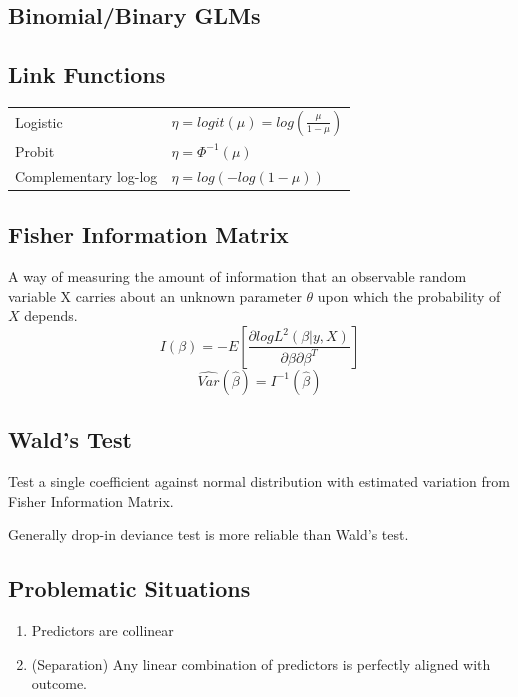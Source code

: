 \documentclass[10pt,landscape, fleqn]{article}
\begin{document}
\begin{multicols}{3}
		\section{Binomial/Binary GLMs}	
			\subsection{Link Functions}
				\begin{tabular}{l l}
					Logistic &  $\eta = logit(\mu) = log\left(\frac{\mu}{1-\mu}\right)$ \\
					Probit & $\eta=\Phi^{-1}(\mu)$ \\
					Complementary log-log & $\eta = log(-log(1-\mu))$ \\
				\end{tabular}
			\subsection{Fisher Information Matrix}
			    A way of measuring the amount of information that an observable random variable X carries about an unknown parameter $\theta$ upon which the probability of $X$ depends.
				\[ I(\beta) = -E[\frac{\partial log L^2(\beta|y, X)}{\partial \beta \partial \beta^T}] \]
				\[ \widehat{Var}(\hat{\beta}) = I^{-1}(\hat{\beta}) \]
			\subsection{Wald's Test}
				Test a single coefficient against normal distribution with estimated variation from Fisher Information Matrix. \par 
				Generally drop-in deviance test is more reliable than Wald's test.
			\subsection{Problematic Situations}
				\begin{enumerate}
					\item Predictors are collinear
					\item (Separation) Any linear combination of predictors is perfectly aligned with outcome.
				\end{enumerate}

\end{multicols}
\end{document}
